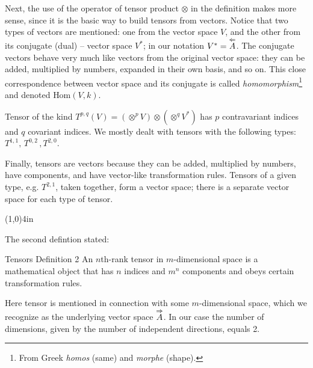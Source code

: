 Next, the use of the operator of tensor product $\otimes$ in the
definition makes more sense, since it is the basic way to build
tensors from vectors. Notice that two types of vectors are mentioned:
one from the vector space $V$, and the other from its conjugate (dual)
-- vector space $V^*$; in our notation $V^*=\overset{\Leftarrow}{A}$. The conjugate
vectors behave very much like vectors from the original vector space:
they can be added, multiplied by numbers, expanded in their own basis,
and so on. This close correspondence between vector space and its conjugate
is called \emph{homomorphism}\footnote{From Greek
\emph{homos} (same) and \emph{morphe} (shape).} and denoted
$\textrm{Hom}(V, k)$.

Tensor of the kind $T^{p,q}(V)=(\otimes^p V)\otimes (\otimes^q V^*)$ has $p$
contravariant indices and $q$ covariant indices. We mostly dealt with
tensors with the following types: $T^{1,1},\,T^{0, 2}\,, T^{2, 0}$.

Finally, tensors are vectors because they can be added, multiplied by
numbers, have components, and have vector-like transformation
rules. Tensors of a given type, e.g. $T^{2, 1}$, taken together, form
a vector space; there is a separate vector space for each type of
tensor.
\begin{center}
\line(1,0){4in}
\end{center}
\vspace{0.5cm}
The second defintion stated:
\begin{mydef}{Tensors Definition 2}
An $n$th-rank tensor in $m$-dimensional space is a mathematical object
that has $n$ indices and $m^n$ components and obeys certain
transformation rules.
\vspace{0.2cm}
\end{mydef}
Here tensor is mentioned in connection with some $m$-dimensional
space, which we recognize as the underlying vector space
$\overset{\Rightarrow}{A}$. In
our case the number of dimensions, given by the number of independent
directions, equals 2.

